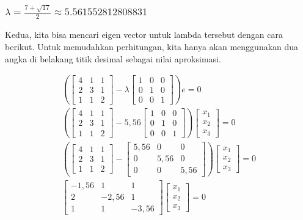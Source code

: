 \documentclass{article}
\begin{document}
\subsubsection{$\lambda = \frac{7 + \sqrt{17}}{2} \approx 5.561552812808831$}
Kedua, kita bisa mencari eigen vector untuk lambda tersebut dengan cara berikut. Untuk memudahkan perhitungan, kita hanya akan menggunakan dua angka di belakang titik desimal sebagai nilai aproksimasi.

\begin{align*}
    \left(
\begin{bmatrix}
4 & 1 & 1\\
2 & 3 & 1\\
1 & 1 & 2
\end{bmatrix}
- \lambda
\begin{bmatrix}
1 & 0 & 0\\
0 & 1 & 0\\
0 & 0 & 1
\end{bmatrix}
    \right)
    e = 0\\
        \left(
\begin{bmatrix}
4 & 1 & 1\\
2 & 3 & 1\\
1 & 1 & 2
\end{bmatrix}
- 5,56
\begin{bmatrix}
1 & 0 & 0\\
0 & 1 & 0\\
0 & 0 & 1
\end{bmatrix}
    \right)
    \begin{bmatrix}
        x_1\\x_2\\x_3
    \end{bmatrix} = 0\\
            \left(
\begin{bmatrix}
4 & 1 & 1\\
2 & 3 & 1\\
1 & 1 & 2
\end{bmatrix}
-
\begin{bmatrix}
5,56 & 0 & 0\\
0 & 5,56 & 0\\
0 & 0 & 5,56
\end{bmatrix}
    \right)
    \begin{bmatrix}
        x_1\\x_2\\x_3
    \end{bmatrix} = 0\\
\begin{bmatrix}
-1,56 & 1 & 1\\
2 & -2,56 & 1\\
1 & 1 & -3,56
\end{bmatrix}
    \begin{bmatrix}
        x_1\\x_2\\x_3
    \end{bmatrix} = 0
\end{align*}
\end{document}
